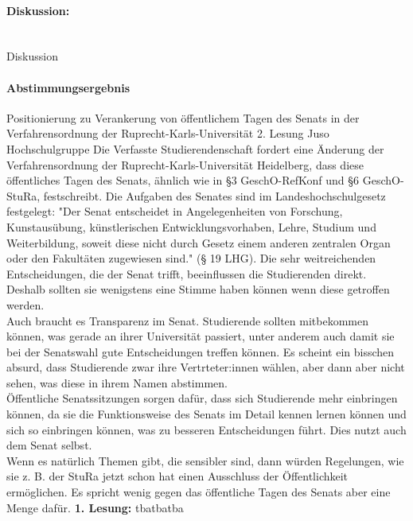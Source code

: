\paragraph{Diskussion:}\phantom{spacer}\\
Diskussion
\paragraph{Abstimmungsergebnis}
\antrag
{
    Positionierung zu Verankerung von öffentlichem Tagen des Senats in der Verfahrensordnung der Ruprecht-Karls-Universität
}{
    2. Lesung
}{
    Juso Hochschulgruppe
}{
    Die Verfasste Studierendenschaft fordert eine Änderung der Verfahrensordnung der
    Ruprecht-Karls-Universität Heidelberg, dass diese öffentliches Tagen des Senats,
    ähnlich wie in §3 GeschO-RefKonf und §6 GeschO-StuRa, festschreibt.
}{
    Die Aufgaben des Senates sind im Landeshochschulgesetz festgelegt: "Der Senat entscheidet in
    Angelegenheiten von Forschung, Kunstausübung, künstlerischen Entwicklungsvorhaben, Lehre, Studium und
    Weiterbildung, soweit diese nicht durch Gesetz einem anderen zentralen Organ oder den Fakultäten
    zugewiesen sind." (§ 19 LHG). Die sehr weitreichenden Entscheidungen, die der Senat trifft,
    beeinflussen die Studierenden direkt. Deshalb sollten sie wenigstens eine Stimme haben können wenn
    diese getroffen werden.\\
    Auch braucht es Transparenz im Senat. Studierende sollten mitbekommen können, was gerade an ihrer
    Universität passiert, unter anderem auch damit sie bei der Senatswahl  gute Entscheidungen treffen
    können. Es scheint ein bisschen absurd, dass Studierende zwar ihre Vertrteter:innen wählen, aber dann
    aber nicht sehen, was diese in ihrem Namen abstimmen.\\
    Öffentliche Senatssitzungen sorgen dafür, dass sich Studierende mehr einbringen können, da sie die
    Funktionsweise des Senats im Detail kennen lernen können und sich so einbringen können, was zu
    besseren Entscheidungen führt. Dies nutzt auch dem Senat selbst.\\
    Wenn es natürlich Themen gibt, die sensibler sind,  dann würden Regelungen, wie sie z. B. der
    StuRa jetzt schon hat einen Ausschluss der Öffentlichkeit ermöglichen. Es spricht wenig gegen das
    öffentliche Tagen des Senats aber eine Menge dafür.
}{
    \textbf{1. Lesung:}
    \ul{
    }
}{tba}{tba}{tba}